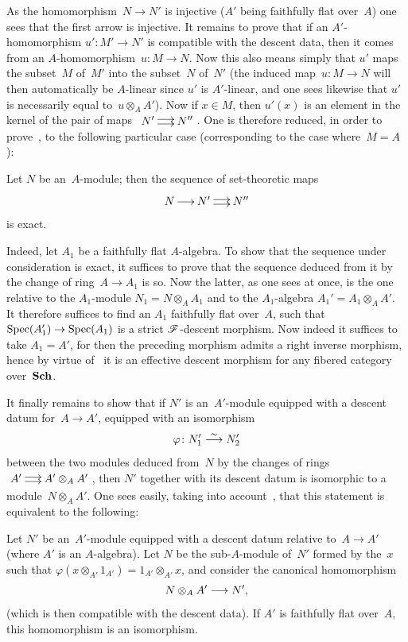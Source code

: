 As
the homomorphism~$N\to N'$ is injective ($A'$ being faithfully
flat over~$A$) one sees that the first arrow is injective. It
remains to prove that if an
$A'$-homomorphism
$u'\colon M'\to N'$ is compatible with the descent data,
then it comes from an $A$-homomorphism~$u\colon M\to N$. Now this
also means simply that $u'$ maps the subset~$M$
of~$M'$ into the subset~$N$ of~$N'$ (the induced map~$u\colon M\to
N$ will then automatically be $A$-linear since $u'$
is $A'$-linear, and one sees likewise that $u'$ is
necessarily equal to~$u\otimes_{A}A'$). Now if $x\in M$,
then $u'(x)$ is an element in the kernel of the pair
of maps~$\xymatrix@C=.5cm{N'\ar@<2pt>[r]\ar@<-2pt>[r] & N''}$. One is
therefore reduced, in order to prove~,
to the following particular case (corresponding to the case where~$M=A$):

\begin{corollary}
\label{VIII.1.5}
Let $N$ be an~$A$-module; then the sequence of set-theoretic maps
$$
\xymatrix@C=.5cm{N\ar[r] & N'\ar@<2pt>[r]\ar@<-2pt>[r] & N''}
$$
is exact.
\end{corollary}

Indeed, let $A_{1}$ be a faithfully flat $A$-algebra. To
show that the sequence under consideration is exact, it suffices to prove
that the sequence deduced from it by the change of ring~$A\to
A_{1}$ is so. Now the latter, as one sees at once, is the one
relative to the
$A_1$-module
$N_{1}=N\otimes_{A}A_{1}$ and to the $A_{1}$-algebra
$A_{1}'=A_{1}\otimes_{A}A'$. It therefore suffices to find an $A_{1}$
faithfully flat over~$A$, such that $\Spec(A_{1}')\to \Spec(A_{1})$
is a strict $\cal{F}$-descent morphism. Now indeed it suffices
to take $A_{1}=A'$, for then the preceding morphism admits
a right inverse morphism, hence by virtue of~\cite{VIII.D} it is an
effective descent morphism for any fibered category
over~$\mathbf{Sch}$.

It finally remains to show that if $N'$ is an~$A'$-module equipped with a
descent datum for~$A\to A'$, \ie equipped with an isomorphism
$$
\varphi\colon N_{1}'\overset{\sim}{\longrightarrow} N_{2}'
$$
between the two modules deduced from~$N$ by the changes
of rings $\xymatrix@C=.5cm{A'\ar@<2pt>[r]\ar@<-2pt>[r] & A'\otimes_{A}A'}$,
then
$N'$ together with its descent datum is isomorphic to a
module~$N\otimes_{A}A'$. One sees easily, taking
into account~, that this statement is equivalent to the following:

\begin{lemma}
\label{VIII.1.6}
Let $N'$ be an~$A'$-module equipped with a descent datum
relative to~$A\to A'$ (where $A'$ is an
$A$-algebra). Let $N$ be the sub-$A$-module of~$N'$ formed
by the~$x$ such that $\varphi(x\otimes_{A'}1_{A'})=1_{A'}\otimes_{A'}x$,
and consider the canonical homomorphism
$$
N\otimes_{A}A'\to N'\quoi,
$$
(which is then compatible with the descent data). If $A'$
is faithfully flat over~$A$, this homomorphism is an
isomorphism.
\end{lemma}

